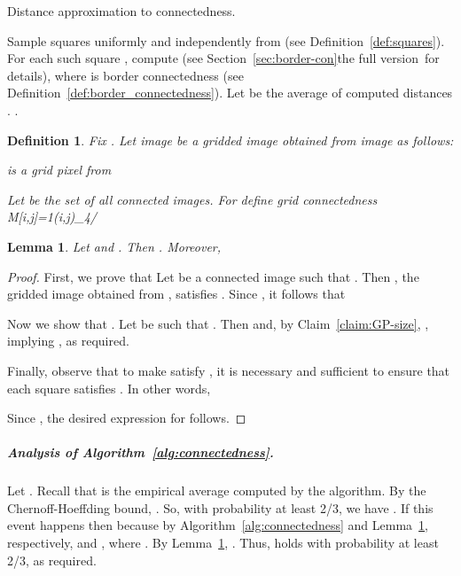 \documentclass[11pt,english]{article}
\newtheorem{lemma}[theorem]{Lemma}
\newtheorem{definition}{Definition}[section]
\numberwithin{figure}{section}
\newcommand{\gp}{\text{GP}}
\newcommand{\mydelta}{\epsilon} \newcommand{\bigdelta}{{\epsilon_0}} \newcommand{\dsquares}{d_{\rm squares}}
\begin{document}
\begin{algorithm}\caption{Distance approximation to connectedness.}
\label{alg:connectedness}
\DontPrintSemicolon
\BlankLine
\nl Sample  squares uniformly and independently from  (see Definition~\ref{def:squares}).\;
\nl\label{step:ave-dist-border-conn} For each such square ,
compute  (see \ifnum{} Section~\ref{sec:border-con}\else the {\color{black} full version}\fi \ for details), where  is border connectedness (see Definition~\ref{def:border_connectedness}). Let  be the average of computed distances .\;
\nl \Return .
\end{algorithm}

\begin{definition}\label{def:grid_pixels} Fix . Let image  be a {\em gridded image} obtained from image  as follows:
\ifnum{}
\begin{center}
 is a grid pixel from 
\end{center}
\else

\fi
Let  be the set of all connected images. For  define \emph{grid connectedness}
M[i,j]=1(i,j)\in \gp_{4/\mydelta}
\end{definition}
\begin{lemma}\label{lem:distance_relation}
 Let  and  . Then . Moreover,

\end{lemma}
\begin{proof}
First, we prove that 
Let  be a connected image such that . Then , the gridded image obtained from , satisfies . Since , it follows that 

Now we show that . Let  be such that . Then  and, by Claim~\ref{claim:GP-size}, , implying , as required.

Finally, observe that to make  satisfy , it is necessary and sufficient to ensure that each square satisfies . In other words,

Since , the desired expression for  follows.
\end{proof}

\ifnum{}

\subparagraph{Analysis of Algorithm~\ref{alg:connectedness}.}
Let . Recall that  is the empirical average computed by the algorithm.
By the Chernoff-Hoeffding bound, . So, with probability at least 2/3, we have . If this event happens then
 because by Algorithm~\ref{alg:connectedness} and Lemma~\ref{lem:distance_relation}, respectively,  and , where . By Lemma~\ref{lem:distance_relation}, . Thus,
 holds with probability at least 2/3, as required.
\end{document}
